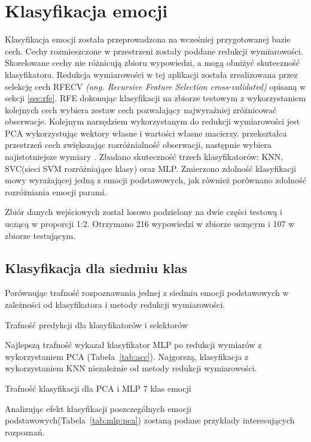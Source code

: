 \documentclass[a4paper,12pt,twoside,openany]{report}
\newcommand{\ang}[1]{\textit{(ang. #1)}}
\newcommand{\Tab}[1]{(Tabela~\ref{#1})}
\begin{document}
\section{Klasyfikacja emocji}
Klasyfikacja emocji została przeprowadzona na wcześniej przygotowanej bazie cech.
Cechy rozmieszczone w przestrzeni zostały poddane redukcji wymiarowości. 
Skorelowane cechy nie różnicują zbioru wypowiedzi, a mogą obniżyć skuteczność klasyfikatora.
Redukcja wymiarowości w tej aplikacji została zrealizowana przez selekcję cech RFECV \ang{Recursive Feature Selection cross-validated} \cite{Guyon2002}
opisaną w sekcji \ref{sec:rfe}.
RFE dokonując klasyfikacji na zbiorze testowym z wykorzystaniem kolejnych cech wybiera zestaw cech pozwalający najwyraźniej zróżnicować obserwacje.
Kolejnym narzędziem wykorzystanym do redukcji wymiarowości jest PCA wykorzystując wektory własne i wartości własne macierzy.
przekształca przestrzeń cech zwiększając rozróżnialność obserwacji, następnie wybiera najistotniejsze wymiary \cite{Bro2014}.
Zbadano skuteczność trzech klasyfikatorów: KNN, SVC(sieci SVM rozróżniające klasy) oraz MLP.
Zmierzono zdolność klasyfikacji mowy wyrażającej jedną z emocji podstawowych, jak również porównano zdolność rozróżniania emocji parami.

Zbiór danych wejściowych został losowo podzielony na dwie części testową i uczącą w proporcji 1:2.
Otrzymano 216 wypowiedzi w zbiorze uczącym i 107 w zbiorze testującym.

\subsection{Klasyfikacja dla siedmiu klas}
Porównując trafność rozpoznawania jednej z siedmiu emocji podstawowych w zależności od klasyfikatora i metody redukcji wymiarowości.
\begin{table}[hc!]
	\caption{Trafność predykcji dla klasyfikatorów i selektorów}
	\centering
	
	\label{tab:acc}
\end{table}
Najlepszą trafność wykazał klasyfikator MLP po redukcji wymiarów z wykorzystaniem PCA \Tab{tab:acc}. 
Najgorszą, klasyfikacja z wykorzystaniem KNN niezależnie od metody redukcji wymiarowości.
\begin{landscape}
\begin{table}[hc!]
	\caption{Trafność klasyfikacji dla PCA i MLP 7 klas emocji}
	\centering
	
	\label{tab:mlp:pca}
\end{table}
\end{landscape}
Analizując efekt klasyfikacji poszczególnych emocji podstawowych\Tab{tab:mlp:pca} zostaną podane przykłady interesujących rozpoznań.
\end{document}
